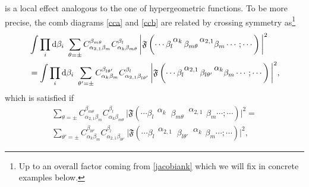 \documentclass[11pt]{article}
\numberwithin{equation}{section}
\newcommand{\rd}{{\rm d}}
\begin{document}
is a local effect analogous to the one of hypergeometric functions. To be more precise, the comb diagrams \eqref{cca} and \eqref{ccb} are related by crossing symmetry as\footnote{Up to an overall factor coming from \eqref{jacobiank} which we will fix in concrete examples below. 
}
\begin{align} 
\nonumber&\int \prod_i\rd\beta_i\ \sum_{\theta=\pm}C^{\beta_{m\theta}}_{\alpha_{2,1}\beta_m}C_{\alpha_{k}\beta_{m\theta}}^{\beta_l}\,\bigg|\mathfrak{F}\left( \cdots\beta_l\begin{matrix} \alpha_{k} \\ \, \end{matrix}  \,\beta_{m\theta} \, \begin{matrix} \alpha_{2,1} \\ \, \end{matrix}\beta_m\cdots ; \cdots \right)\bigg|^2\\
\label{crosssympre}&=
\int \prod_i\rd\beta_i\ \sum_{\theta'=\pm}C^{\beta_{l\theta'}}_{\alpha_k\beta_m}C_{\alpha_{2,1}\beta_{l\theta'}}^{\beta_l}\,\bigg|\mathfrak{F}\left( \cdots\beta_l\begin{matrix} \alpha_{2,1} \\ \, \end{matrix}  \,\beta_{l\theta'} \, \begin{matrix} \alpha_{k} \\ \, \end{matrix}\beta_m\cdots ; \cdots \right)\bigg|^2,\end{align}
which is satisfied if 
\begin{align} \label{crosssym}
\sum_{\theta=\pm}C^{\beta_{m\theta}}_{\alpha_{2,1}\beta_m}C_{\alpha_{k}\beta_{m\theta}}^{\beta_l}\,\bigg|\mathfrak{F}\left( \cdots\beta_l\begin{matrix} \alpha_{k} \\ \, \end{matrix}  \,\beta_{m\theta} \, \begin{matrix} \alpha_{2,1} \\ \, \end{matrix}\beta_m\cdots ; \cdots \right)\bigg|^2=\\
\sum_{\theta'=\pm}C^{\beta_{l\theta'}}_{\alpha_k\beta_m}C_{\alpha_{2,1}\beta_{l\theta'}}^{\beta_l}\,\bigg|\mathfrak{F}\left( \cdots\beta_l\begin{matrix} \alpha_{2,1} \\ \, \end{matrix}  \,\beta_{l\theta'} \, \begin{matrix} \alpha_{k} \\ \, \end{matrix}\beta_m\cdots ; \cdots \right)\bigg|^2,\end{align}
\end{document}
